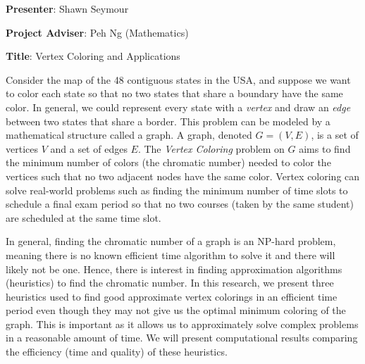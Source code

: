 \documentclass[12pt,letterpaper]{article}
\begin{document}
\noindent\textbf{Presenter}: Shawn Seymour

\vspace{0.3cm}

\noindent\textbf{Project Adviser}: Peh Ng (Mathematics)

\vspace{0.3cm}

\noindent\textbf{Title}: Vertex Coloring and Applications

\vspace{0.3cm}

Consider the map of the 48 contiguous states in the USA, and suppose we want to color each state so that no two states that share a boundary have the same color. In general, we could represent every state with a \emph{vertex} and draw an \emph{edge} between two states that share a border. This problem can be modeled by a mathematical structure called a graph. A graph, denoted \(G = (V,E)\), is a set of vertices \(V\) and a set of edges \(E\). The \emph{Vertex Coloring} problem on \(G\) aims to find the minimum number of colors (the chromatic number) needed to color the vertices such that no two adjacent nodes have the same color. Vertex coloring can solve real-world problems such as finding the minimum number of time slots to schedule a final exam period so that no two courses (taken by the same student) are scheduled at the same time slot. \newline

In general, finding the chromatic number of a graph is an NP-hard problem, meaning there is no known efficient time algorithm to solve it and there will likely not be one. Hence, there is interest in finding approximation algorithms (heuristics) to find the chromatic number. In this research, we present three heuristics used to find good approximate vertex colorings in an efficient time period even though they may not give us the optimal minimum coloring of the graph. This is important as it allows us to approximately solve complex problems in a reasonable amount of time. We will present computational results comparing the efficiency (time and quality) of these heuristics.
\end{document}
